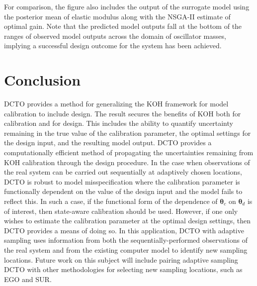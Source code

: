 \documentclass[twocolumn,10pt]{asme2ej}
\begin{document}
%
For comparison, the figure also includes the output of the surrogate model using the posterior mean of elastic modulus along with the NSGA-II estimate of optimal gain.
%
Note that the predicted model outputs fall at the bottom of the ranges of observed model outputs across the domain of oscillator masses, implying a successful design outcome for the system has been achieved.
%

%
\section{Conclusion}\label{sec:conclusion}
%
DCTO provides a method for generalizing the KOH framework for model calibration to include design.
%
The result secures the benefits of KOH both for calibration and for design.
%
This includes the ability to quantify uncertainty remaining in the true value of the calibration parameter, the optimal settings for the design input, and the resulting model output.
%
DCTO provides a computationally efficient method of propagating the uncertainties remaining from KOH calibration through the design procedure.
%
In the case when observations of the real system can be carried out sequentially at adaptively chosen locations, DCTO is robust to model misspecification where the calibration parameter is functionally dependent on the value of the design input and the model fails to reflect this.
%
In such a case, if the functional form of the dependence of $\boldsymbol\theta_c$ on $\boldsymbol\theta_d$ is of interest, then state-aware calibration should be used.
%
However, if one only wishes to estimate the calibration parameter at the optimal design settings, then DCTO provides a means of doing so.
%
In this application, DCTO with adaptive sampling uses information from both the sequentially-performed observations of the real system and from the existing computer model to identify new sampling locations.
%
Future work on this subject will include pairing adaptive sampling DCTO with other methodologies for selecting new sampling locations, such as EGO and SUR.
%

\bigskip

%
%
%
%
\end{document}
